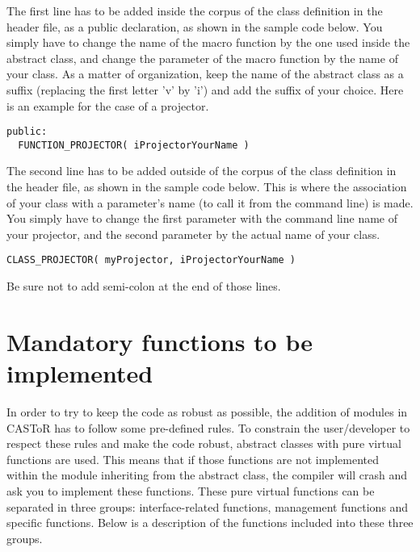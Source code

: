 \documentclass[a4paper, 11pt]{article}
\begin{document}
The first line has to be added inside the corpus of the class definition in the header file, as a public declaration, as shown in the sample code below.
You simply have to change the name of the macro function by the one used inside the abstract class, and change the parameter of the macro function by the name of your class.
As a matter of organization, keep the name of the abstract class as a suffix (replacing the first letter 'v' by 'i') and add the suffix of your choice.
Here is an example for the case of a projector.
\begin{lstlisting}[label={make_function},caption=The function that creates the projector.]
public:
  FUNCTION_PROJECTOR( iProjectorYourName )
\end{lstlisting}

The second line has to be added outside of the corpus of the class definition in the header file, as shown in the sample code below.
This is where the association of your class with a parameter's name (to call it from the command line) is made.
You simply have to change the first parameter with the command line name of your projector, and the second parameter by the actual name of your class.
\begin{lstlisting}[label={class_creator},caption=The singleton class that uses the maker function to create the projector.]
CLASS_PROJECTOR( myProjector, iProjectorYourName )
\end{lstlisting}

Be sure not to add semi-colon at the end of those lines.\\

\section{Mandatory functions to be implemented}

In order to try to keep the code as robust as possible, the addition of modules in CASToR has to follow some pre-defined rules.
To constrain the user/developer to respect these rules and make the code robust, abstract classes with pure virtual functions are used.
This means that if those functions are not implemented within the module inheriting from the abstract class, the compiler will crash and ask you to implement these functions.
These pure virtual functions can be separated in three groups: interface-related functions, management functions and specific functions.
Below is a description of the functions included into these three groups.
\end{document}
